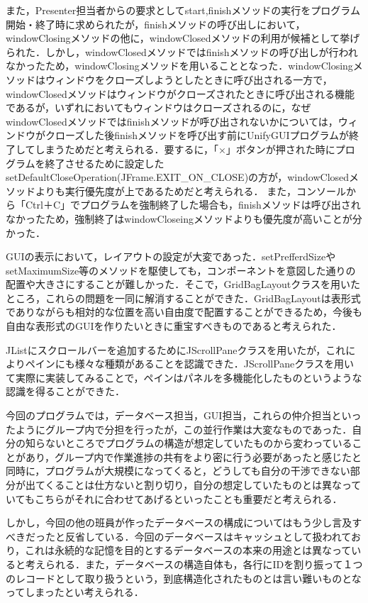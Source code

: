\documentclass[12pt]{jarticle}
\begin{document}
また，Presenter担当者からの要求としてstart,finishメソッドの実行をプログラム開始・終了時に求められたが，finishメソッドの呼び出しにおいて，windowClosingメソッドの他に，windowClosedメソッドの利用が候補として挙げられた．しかし，windowClosedメソッドではfinishメソッドの呼び出しが行われなかったため，windowClosingメソッドを用いることとなった．windowClosingメソッドはウィンドウをクローズしようとしたときに呼び出される一方で，windowClosedメソッドはウィンドウがクローズされたときに呼び出される機能であるが，いずれにおいてもウィンドウはクローズされるのに，なぜwindowClosedメソッドではfinishメソッドが呼び出されないかについては，ウィンドウがクローズした後finishメソッドを呼び出す前にUnifyGUIプログラムが終了してしまうためだと考えられる．要するに，「×」ボタンが押された時にプログラムを終了させるために設定したsetDefaultCloseOperation(JFrame.EXIT\_ON\_CLOSE)の方が，windowClosedメソッドよりも実行優先度が上であるためだと考えられる．
また，コンソールから「Ctrl＋C」でプログラムを強制終了した場合も，finishメソッドは呼び出されなかったため，強制終了はwindowCloseingメソッドよりも優先度が高いことが分かった．

GUIの表示において，レイアウトの設定が大変であった．setPrefferdSizeやsetMaximumSize等のメソッドを駆使しても，コンポーネントを意図した通りの配置や大きさにすることが難しかった．そこで，GridBagLayoutクラスを用いたところ，これらの問題を一同に解消することができた．GridBagLayoutは表形式でありながらも相対的な位置を高い自由度で配置することができるため，今後も自由な表形式のGUIを作りたいときに重宝すべきものであると考えられた．

JListにスクロールバーを追加するためにJScrollPaneクラスを用いたが，これによりペインにも様々な種類があることを認識できた．JScrollPaneクラスを用いて実際に実装してみることで，ペインはパネルを多機能化したものというような認識を得ることができた．

今回のプログラムでは，データベース担当，GUI担当，これらの仲介担当といったようにグループ内で分担を行ったが，この並行作業は大変なものであった．自分の知らないところでプログラムの構造が想定していたものから変わっていることがあり，グループ内で作業進捗の共有をより密に行う必要があったと感じたと同時に，プログラムが大規模になってくると，どうしても自分の干渉できない部分が出てくることは仕方ないと割り切り，自分の想定していたものとは異なっていてもこちらがそれに合わせてあげるといったことも重要だと考えられる．

しかし，今回の他の班員が作ったデータベースの構成についてはもう少し言及すべきだったと反省している．今回のデータベースはキャッシュとして扱われており，これは永続的な記憶を目的とするデータベースの本来の用途とは異なっていると考えられる．また，データベースの構造自体も，各行にIDを割り振って１つのレコードとして取り扱うという，到底構造化されたものとは言い難いものとなってしまったとい考えられる．
\end{document}
